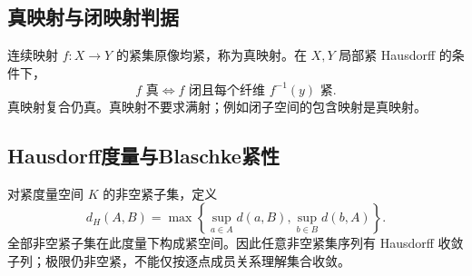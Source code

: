 \documentclass[../main.tex]{subfiles}
\begin{document}
\subsection{真映射与闭映射判据}
连续映射 $f:X\to Y$ 的紧集原像均紧，称为真映射。在 $X,Y$ 局部紧 Hausdorff 的条件下，
\[
f\text{ 真}\iff f\text{ 闭且每个纤维 }f^{-1}(y)\text{ 紧}.
\]
真映射复合仍真。真映射不要求满射；例如闭子空间的包含映射是真映射。
\subsection{Hausdorff度量与Blaschke紧性}
对紧度量空间 $K$ 的非空紧子集，定义
\[
d_H(A,B)=\max\left\{\sup_{a\in A}d(a,B),\sup_{b\in B}d(b,A)\right\}.
\]
全部非空紧子集在此度量下构成紧空间。因此任意非空紧集序列有 Hausdorff 收敛子列；极限仍非空紧，不能仅按逐点成员关系理解集合收敛。
\clearpage
\end{document}
